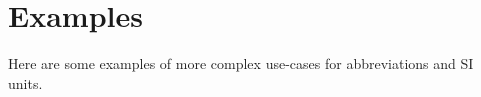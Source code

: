\documentclass[../../main.tex]{subfiles}  %
\begin{document}
\section{Examples}
	Here are some examples of more complex use-cases for abbreviations and SI units. 
\end{document}

